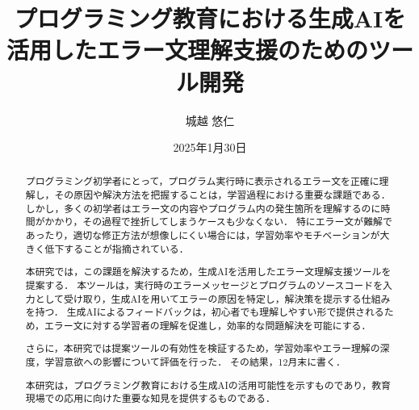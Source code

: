 \documentclass[12pt,twoside]{jbook}
\begin{document}
\title{%
  プログラミング教育における生成AIを活用したエラー文理解支援のためのツール開発
}


\author{%
  城越 悠仁
}

\date{2025年1月30日}






\maketitle


\begin{abstract}
  プログラミング初学者にとって，プログラム実行時に表示されるエラー文を正確に理解し，その原因や解決方法を把握することは，学習過程における重要な課題である．
  しかし，多くの初学者はエラー文の内容やプログラム内の発生箇所を理解するのに時間がかかり，その過程で挫折してしまうケースも少なくない．
  特にエラー文が難解であったり，適切な修正方法が想像しにくい場合には，学習効率やモチベーションが大きく低下することが指摘されている．

  本研究では，この課題を解決するため，生成AIを活用したエラー文理解支援ツールを提案する．
  本ツールは，実行時のエラーメッセージとプログラムのソースコードを入力として受け取り，生成AIを用いてエラーの原因を特定し，解決策を提示する仕組みを持つ．
  生成AIによるフィードバックは，初心者でも理解しやすい形で提供されるため，エラー文に対する学習者の理解を促進し，効率的な問題解決を可能にする．

  さらに，本研究では提案ツールの有効性を検証するため，学習効率やエラー理解の深度，学習意欲への影響について評価を行った．
  その結果，12月末に書く．

  本研究は，プログラミング教育における生成AIの活用可能性を示すものであり，教育現場での応用に向けた重要な知見を提供するものである．
\end{abstract}
\end{document}

